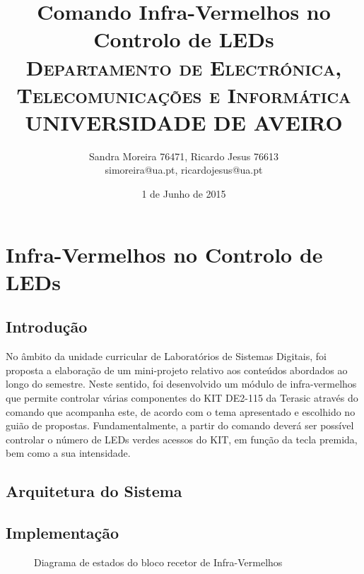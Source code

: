 \documentclass[a4paper,11pt,openright,oneside]{report}
\begin{document}
\title{\textbf{Comando Infra-Vermelhos no Controlo de LEDs}\\[1cm]\textsc{\small {Departamento de Electrónica, Telecomunicações e Informática} \\ \large {UNIVERSIDADE DE AVEIRO}}}
\author{Sandra Moreira 76471, Ricardo Jesus 76613\\simoreira@ua.pt, ricardojesus@ua.pt}
\date{1 de Junho de 2015}
\maketitle
{}

\chapter{Infra-Vermelhos no Controlo de LEDs}

\section{Introdução}
\label{sec:introdução}

No âmbito da unidade curricular de Laboratórios de Sistemas Digitais, foi proposta a elaboração de um mini-projeto relativo aos conteúdos abordados ao longo do semestre. Neste sentido, foi desenvolvido um módulo de infra-vermelhos que permite controlar várias componentes do KIT DE2-115 da Terasic através do comando que acompanha este, de acordo com o tema apresentado e escolhido no guião de propostas. Fundamentalmente, a partir do comando deverá ser possível controlar o número de LEDs verdes acessos do KIT, em função da tecla premida, bem como a sua intensidade.

\section{Arquitetura do Sistema}
\label{sec:arquitetura}



\section{Implementação}
\label{sec:implementação}

\begin{figure}[ht]
\center
{}
\caption{Diagrama de estados do bloco recetor de Infra-Vermelhos}
\label{fig:ir_leds1}
\end{figure}
\end{document}
